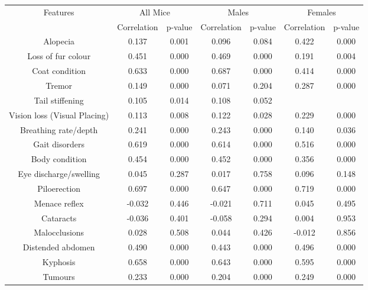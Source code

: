 \documentclass[11pt,reqno]{amsart}
\begin{document}
\begin{table}
\centering
\begin{tabular}{|c|c|c|c|c|c|c|}
\hline
\multicolumn{1}{|c|}{Features} & \multicolumn{2}{c}{All Mice} & \multicolumn{2}{|c}{Males} & \multicolumn{2}{|c|}{Females} \\ 
\cline{2-7}

\multicolumn{1}{|c|}{} & Correlation & p-value & Correlation & p-value & Correlation & p-value \\
\hline 
 Alopecia                     & 0.137    & 0.001  & 0.096  & 0.084  & 0.422   & 0.000  \\
Loss of fur colour           & 0.451    & 0.000  & 0.469  & 0.000  & 0.191   & 0.004  \\
Coat condition               & 0.633    & 0.000  & 0.687  & 0.000  & 0.414   & 0.000  \\
Tremor                       & 0.149    & 0.000  & 0.071  & 0.204  & 0.287   & 0.000  \\
Tail stiffening              & 0.105    & 0.014  & 0.108  & 0.052  &         &        \\
Vision loss (Visual Placing) & 0.113    & 0.008  & 0.122  & 0.028  & 0.229   & 0.000  \\
Breathing rate/depth         & 0.241    & 0.000  & 0.243  & 0.000  & 0.140   & 0.036  \\
Gait disorders               & 0.619    & 0.000  & 0.614  & 0.000  & 0.516   & 0.000  \\
Body condition               & 0.454    & 0.000  & 0.452  & 0.000  & 0.356   & 0.000  \\
Eye discharge/swelling       & 0.045    & 0.287  & 0.017  & 0.758  & 0.096   & 0.148  \\
Piloerection                 & 0.697    & 0.000  & 0.647  & 0.000  & 0.719   & 0.000  \\
Menace reflex                & -0.032   & 0.446  & -0.021 & 0.711  & 0.045   & 0.495  \\
Cataracts                    & -0.036   & 0.401  & -0.058 & 0.294  & 0.004   & 0.953  \\
Malocclusions                & 0.028    & 0.508  & 0.044  & 0.426  & -0.012  & 0.856  \\
Distended abdomen            & 0.490    & 0.000  & 0.443  & 0.000  & 0.496   & 0.000  \\
Kyphosis                     & 0.658    & 0.000  & 0.643  & 0.000  & 0.595   & 0.000  \\
Tumours                      & 0.233    & 0.000  & 0.204  & 0.000  & 0.249   & 0.000  \\

\end{tabular}
\end{table}
\end{document}
